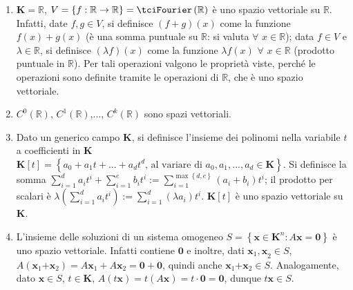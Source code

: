 \documentclass{article}
\begin{document}
\begin{enumerate}
\item $\mathbf{K}=%
\mathbb{R}
$, $V=\left\{ f:%
\mathbb{R}
\rightarrow 
\mathbb{R}
\right\} =\tciFourier \left( 
\mathbb{R}
\right) $ \`{e} uno spazio vettoriale su $%
\mathbb{R}
$. Infatti, date $f,g\in V$, si definisce $\left( f+g\right) \left( x\right) 
$ come la funzione $f\left( x\right) +g\left( x\right) $ (\`{e} una somma
puntuale su $%
\mathbb{R}
$: si valuta $\forall $ $x\in 
\mathbb{R}
$); data $f\in V$ e $\lambda \in 
\mathbb{R}
$, si definisce $\left( \lambda f\right) \left( x\right) $ come la funzione $%
\lambda f\left( x\right) $ $\forall $ $x\in 
\mathbb{R}
$ (prodotto puntuale in $%
\mathbb{R}
$). Per tali operazioni valgono le propriet\`{a} viste, perch\'{e} le
operazioni sono definite tramite le operazioni di $%
\mathbb{R}
$, che \`{e} uno spazio vettoriale.

\item $C^{0}\left( 
\mathbb{R}
\right) $, $C^{1}\left( 
\mathbb{R}
\right) $,..., $C^{k}\left( 
\mathbb{R}
\right) $ sono spazi vettoriali.

\item Dato un generico campo $\mathbf{K}$, si definisce l'insieme dei polinomi nella variabile $t$ a coefficienti in $\mathbf{K}$ $\mathbf{K}\left[ t%
\right] =\left\{ a_{0}+a_{1}t+...+a_{d}t^{d}\text{, al variare di 
}a_{0},a_{1},...,a_{d}\in \mathbf{K}\right\} $. Si definisce la somma $%
\sum_{i=1}^{d}a_{i}t^{i}+\sum_{i=1}^{e}b_{i}t^{i}:=\sum_{i=1}^{\max \left\{
d,e\right\} }\left( a_{i}+b_{i}\right) t^{i}$; il prodotto per scalari \`{e} 
$\lambda \left( \sum_{i=1}^{d}a_{i}t^{i}\right) :=\sum_{i=1}^{d}\left(
\lambda a_{i}\right) t^{i}$. $\mathbf{K}\left[ t\right] $ \`{e} uno spazio
vettoriale su $\mathbf{K}$.

\item L'insieme delle soluzioni di un sistema omogeneo $S=\left\{ \mathbf{x}%
\in \mathbf{K}^{n}:A\mathbf{x=0}\right\} $ \`{e} uno spazio vettoriale.
Infatti contiene $\mathbf{0}$ e inoltre, dati $\mathbf{x}_{1}\mathbf{,x}%
_{2}\in S$, $A\left( \mathbf{x}_{1}\mathbf{+x}_{2}\right) =A\mathbf{x}_{1}+A%
\mathbf{x}_{2}=\mathbf{0+0}$, quindi anche $\mathbf{x}_{1}\mathbf{+x}_{2}\in
S$. Analogamente, dato $\mathbf{x}\in S$, $t\in \mathbf{K}$, $A\left( t%
\mathbf{x}\right) =t\left( A\mathbf{x}\right) =t\cdot \mathbf{0=0}$, dunque $%
t\mathbf{x}\in S$.
\end{enumerate}
\end{document}
